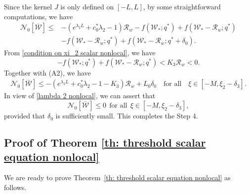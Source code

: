 \documentclass[11pt,a4paper]{article}
\numberwithin{equation}{section}
\numberwithin{figure}{section}
\newcommand\beaa{\begin{eqnarray*}}
\newcommand\eeaa{\end{eqnarray*}}
\begin{document}
Since the kernel $J$ is only defined on $[-L,L]$, by some straightforward computations, we have
\begin{equation*}
\begin{aligned}
\mathcal{N}_0[\bar{\mathcal W}]
\le&-(e^{\lambda_2L}+c_0^*\lambda_2-1)\mathcal{R}_w-f(\mathcal{W}_*;q^*)+f(\mathcal{W}_*-\mathcal{R}_w;q^*)\\
&-f(\mathcal{W}_*-\mathcal{R}_w;q^*)+f(\mathcal{W}_*-\mathcal{R}_w;q^*+\delta_0).
\end{aligned}
\end{equation*}
From \eqref{condition on xi_2 scalar nonlocal}, we have 
$$-f(\mathcal{W}_*;q^*)+f(\mathcal{W}_*-\mathcal{R}_w;q^*)< K_3\mathcal{R}_w<0.$$
Together with (A2), we have
\beaa
\mathcal{N}_0[\bar{\mathcal W}]\leq -(e^{\lambda_2L}+c_0^*\lambda_2-1-K_3)\mathcal{R}_w+L_0\delta_0\quad\text{for all}\quad \xi\in[-M,\xi_2-\delta_3].
\eeaa
In view of \eqref{lambda 2 nonlocal},
we can assert that 
$$\mathcal{N}_0[\bar{\mathcal W}]\le 0\ \ \text{for all}\ \ \xi\in[-M,\xi_2-\delta_3],$$
provided that $\delta_0$ is sufficiently small.
This completes the Step 4.

\subsection{Proof of Theorem \ref{th: threshold scalar equation nonlocal}}

\noindent

We are ready to prove Theorem~\ref{th: threshold scalar equation nonlocal} as follows.
\end{document}
